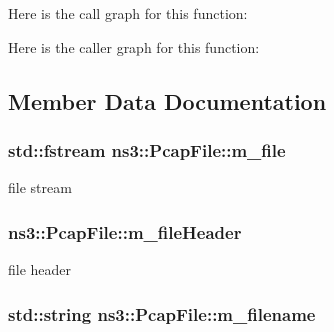 Here is the call graph for this function\+:




Here is the caller graph for this function\+:




\subsection{Member Data Documentation}
\subsubsection[{\texorpdfstring{m\+\_\+file}{m_file}}]{\setlength{\rightskip}{0pt plus 5cm}std\+::fstream ns3\+::\+Pcap\+File\+::m\+\_\+file\hspace{0.3cm}{\ttfamily [private]}}\hypertarget{classns3_1_1PcapFile_ac8ecc2d37ff1e2a5148901e10f855c26}{}\label{classns3_1_1PcapFile_ac8ecc2d37ff1e2a5148901e10f855c26}


file stream 

\subsubsection[{\texorpdfstring{m\+\_\+file\+Header}{m_fileHeader}}]{ ns3\+::\+Pcap\+File\+::m\+\_\+file\+Header\hspace{0.3cm}{\ttfamily [private]}}\hypertarget{classns3_1_1PcapFile_a44261d9566e738203968f357584e268c}{}\label{classns3_1_1PcapFile_a44261d9566e738203968f357584e268c}


file header 

\subsubsection[{\texorpdfstring{m\+\_\+filename}{m_filename}}]{\setlength{\rightskip}{0pt plus 5cm}std\+::string ns3\+::\+Pcap\+File\+::m\+\_\+filename\hspace{0.3cm}{\ttfamily [private]}}\hypertarget{classns3_1_1PcapFile_a352f69f3045f8e1ebbc42ab5ab540b68}{}\label{classns3_1_1PcapFile_a352f69f3045f8e1ebbc42ab5ab540b68}


